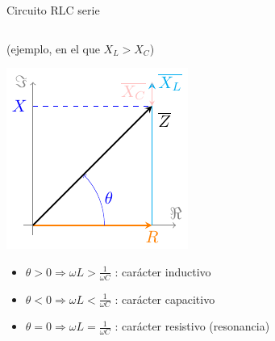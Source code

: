 \documentclass[aspectratio=169, usenames,svgnames,dvipsnames]{beamer}
\begin{document}
\begin{frame}{Circuito RLC serie}
\begin{columns}
    \begin{column}{0.5\columnwidth}
        \vspace{-3mm}
        \hspace*{12mm}(ejemplo, en el que $X_L > X_C$)
        \begin{center}
            \includegraphics[width=.67\linewidth]{../figs/fasorRLC.pdf}
        \end{center}

        \vspace{-3mm}
        \begin{itemize}
            \item \(\theta > 0 \Rightarrow \omega L > \frac{1}{\omega C}\) : carácter inductivo
            \item \(\theta < 0 \Rightarrow \omega L < \frac{1}{\omega C}\) : carácter capacitivo
            \item \(\theta = 0 \Rightarrow \omega L = \frac{1}{\omega C}\) : carácter resistivo (resonancia)
        \end{itemize}    
    \end{column}
    \end{columns}
\end{frame}

\end{document}
